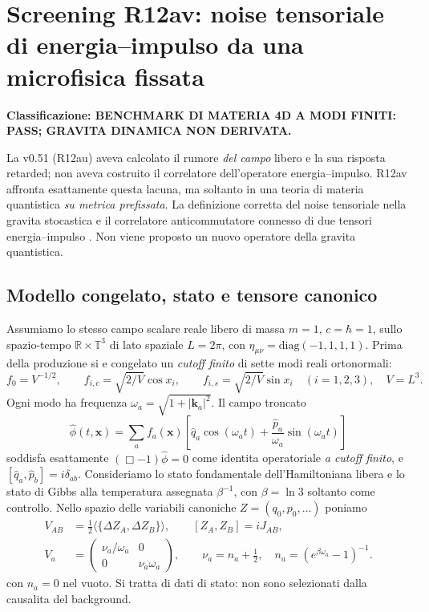 \documentclass[11pt,a4paper]{article}
\newcommand{\status}[1]{\textsf{#1}}
\begin{document}
\clearpage
\section{Screening R12av: noise tensoriale di energia--impulso da una microfisica fissata}
\label{sec:r12av-stress}
\textbf{Classificazione: \status{BENCHMARK DI MATERIA 4D A MODI FINITI: PASS; GRAVITA DINAMICA NON DERIVATA}.}

La v0.51 (R12au) aveva calcolato il rumore \emph{del campo} libero e la sua risposta retarded; non aveva costruito il correlatore dell'operatore energia--impulso. R12av affronta esattamente questa lacuna, ma soltanto in una teoria di materia quantistica \emph{su metrica prefissata}. La definizione corretta del noise tensoriale nella gravita stocastica e il correlatore anticommutatore connesso di due tensori energia--impulso \cite{HuVerdaguer2008,PhillipsHu2001}. Non viene proposto un nuovo operatore della gravita quantistica.

\subsection{Modello congelato, stato e tensore canonico}
Assumiamo lo stesso campo scalare reale libero di massa $m=1$, $c=\hbar=1$, sullo spazio-tempo $\mathbb R\times\mathbb T^3$ di lato spaziale $L=2\pi$, con $\eta_{\mu\nu}=\mathrm{diag}(-1,1,1,1)$. Prima della produzione si e congelato un \emph{cutoff finito} di sette modi reali ortonormali:
\begin{equation}
 f_0=V^{-1/2},\qquad f_{i,c}=\sqrt{2/V}\cos x_i,\qquad
 f_{i,s}=\sqrt{2/V}\sin x_i\quad (i=1,2,3),\quad V=L^3.
 \label{eq:r12av-modes}
\end{equation}
Ogni modo ha frequenza $\omega_a=\sqrt{1+|\mathbf k_a|^2}$. Il campo troncato
\begin{equation}
 \hat\phi(t,\mathbf x)=\sum_a f_a(\mathbf x)
 \left[\hat q_a\cos(\omega_at)+\frac{\hat p_a}{\omega_a}\sin(\omega_at)\right]
 \label{eq:r12av-field}
\end{equation}
soddisfa esattamente $(\Box-1)\hat\phi=0$ come identita operatoriale \emph{a cutoff finito}, e $[\hat q_a,\hat p_b]=i\delta_{ab}$. Consideriamo lo stato fondamentale dell'Hamiltoniana libera e lo stato di Gibbs alla temperatura assegnata $\beta^{-1}$, con $\beta=\ln3$ soltanto come controllo. Nello spazio delle variabili canoniche $Z=(q_0,p_0,\ldots)$ poniamo
\begin{equation}
\begin{aligned}
 V_{AB}&=\frac12\langle\{\Delta Z_A,\Delta Z_B\}\rangle,\qquad
 [Z_A,Z_B]=iJ_{AB},\\
 V_a&=\begin{pmatrix}\nu_a/\omega_a&0\\0&\nu_a\omega_a\end{pmatrix},
 \qquad \nu_a=n_a+\frac12,\quad n_a=(e^{\beta\omega_a}-1)^{-1}.
\end{aligned}
 \label{eq:r12av-canonical-cov}
\end{equation}
con $n_a=0$ nel vuoto. Si tratta di dati di stato: non sono selezionati dalla causalita del background.
\end{document}
